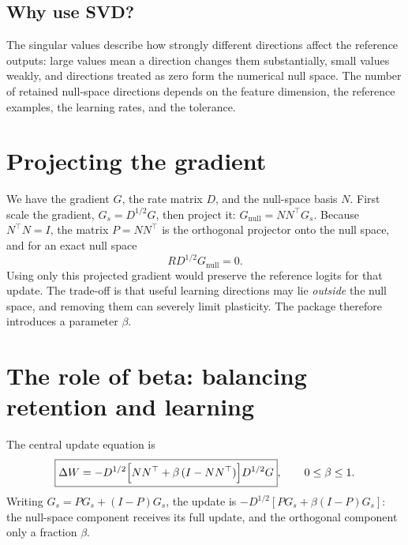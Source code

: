 \documentclass[11pt,a4paper]{article}
\begin{document}
\subsection{Why use SVD?}

The singular values describe how strongly different directions affect the reference outputs: large values mean a direction changes them substantially, small values weakly, and directions treated as zero form the numerical null space. The number of retained null-space directions depends on the feature dimension, the reference examples, the learning rates, and the tolerance.

\section{Projecting the gradient}

We have the gradient $G$, the rate matrix $D$, and the null-space basis $N$. First scale the gradient, $G_s=D^{1/2}G$, then project it: $G_{\text{null}}=NN^\top G_s$. Because $N^\top N=I$, the matrix $P=NN^\top$ is the orthogonal projector onto the null space, and for an exact null space
\[
RD^{1/2}G_{\text{null}}=0.
\]
Using only this projected gradient would preserve the reference logits for that update. The trade-off is that useful learning directions may lie \emph{outside} the null space, and removing them can severely limit plasticity. The package therefore introduces a parameter $\beta$.

\section{The role of beta: balancing retention and learning}

The central update equation is
\[
\boxed{\Delta W=-D^{1/2}\Bigl[NN^\top+\beta\,(I-NN^\top)\Bigr]D^{1/2}G},\qquad 0\le\beta\le1.
\]
Writing $G_s=PG_s+(I-P)G_s$, the update is $-D^{1/2}[PG_s+\beta(I-P)G_s]$: the null-space component receives its full update, and the orthogonal component only a fraction $\beta$.
\end{document}
